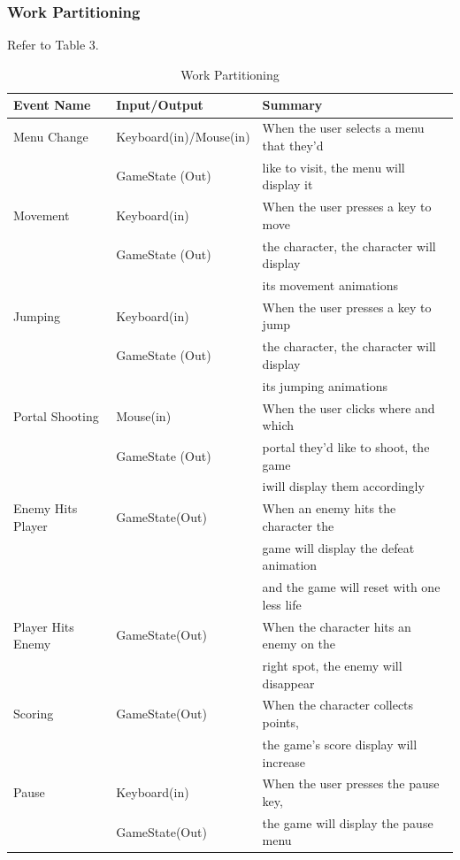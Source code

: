 \documentclass[12pt, titlepage]{article}
\begin{document}
\subsubsection{Work Partitioning}
Refer to Table 3.
\begin{table}
\caption{Work Partitioning}
\begin{tabular}{lll}
\hline
Event Name & Input/Output & Summary\\
\hline
Menu Change      	&  Keyboard(in)/Mouse(in)  & When the user selects a menu that they'd\\
& GameState (Out) & like to visit, the menu will display it   \\

Movement      		&  Keyboard(in)  & When the user presses a key to move\\  
& GameState (Out) & the character, the character will display \\
& & its movement animations   \\

Jumping		 &  Keyboard(in)  & When the user presses a key to jump\\  
& GameState (Out) & the character, the character will display \\
& & its jumping animations   \\

Portal Shooting	 &  Mouse(in)  & When the user clicks where and which\\  
& GameState (Out) & portal they'd like to shoot, the game \\
& & iwill display them accordingly   \\

Enemy Hits Player			 &  GameState(Out)  & When an enemy hits the character the \\  
& & game will display the defeat animation \\
& & and the game will reset with one less life   \\

Player Hits Enemy		 &  GameState(Out)  & When the character hits an enemy on the\\  
& &  right spot, the enemy will disappear \\

Scoring	 &  GameState(Out)  & When the character collects points,  \\  
& & the game's score display will increase \\

Pause	 &   Keyboard(in) & When the user presses the pause key, \\  
& GameState(Out)& the game will display the pause menu \\
\hline
\end{tabular}
\end{table}
\end{document}
